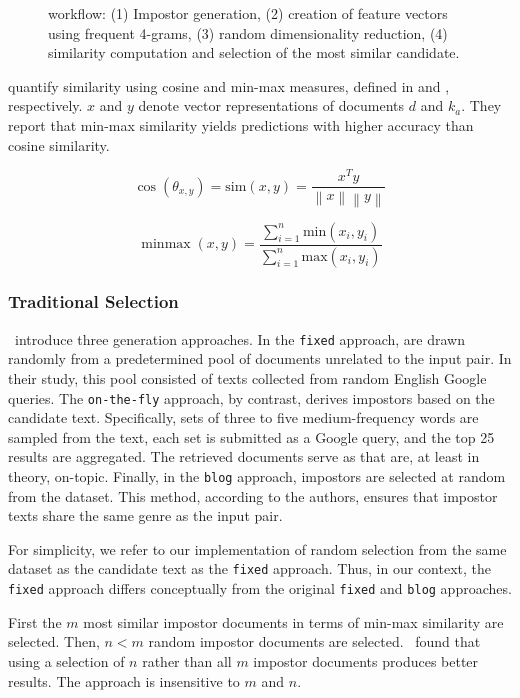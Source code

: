 \begin{figure}[htbp]
    \centering
    
    \caption[\impAppr{} workflow]{\impAppr{} workflow: (1) Impostor generation, (2) creation of feature vectors using frequent 4-grams, (3) random dimensionality reduction, (4) similarity computation and selection of the most similar candidate.}
    \label{fig:impostor}
\end{figure}

\citet{koppel_determining_2014} quantify similarity using cosine and min-max measures, defined in  and , respectively. 
$x$ and $y$ denote vector representations of documents $d$ and $k_a$.
They report that min-max similarity yields predictions with higher accuracy than cosine similarity.

\begin{equation}
    \cos(\theta_{x,y})=\mathrm{sim}(x,y)=\frac{x^Ty}{\left\| x \right\|\left\| y \right\|}
    \label{eq:cosine_sim}
\end{equation}

\begin{equation}
    \operatorname{minmax}(x,y)=\frac{\sum_{i=1}^{n}\mathrm{min}(x_i,y_i)}{\sum_{i=1}^{n}\mathrm{max}(x_i,y_i)}
    \label{eq:min_max_sim}
\end{equation}

\subsubsection{Traditional \Imp{} Selection}
\label{subsubsec:traditional_impostor_generation}

\citet{koppel_determining_2014}\ introduce three \imp{} generation approaches. 
In the \texttt{fixed} approach, \imps{} are drawn randomly from a predetermined pool of documents unrelated to the input pair.
In their study, this pool consisted of texts collected from random English Google queries. 
The \texttt{on-the-fly} approach, by contrast, derives impostors based on the candidate text. 
Specifically, sets of three to five medium-frequency words are sampled from the text, each set is submitted as a Google query, and the top 25 results are aggregated. 
The retrieved documents serve as \imps{} that are, at least in theory, on-topic. 
Finally, in the \texttt{blog} approach, impostors are selected at random from the \dataBlog{} dataset. 
This method, according to the authors, ensures that impostor texts share the same genre as the input pair.

For simplicity, we refer to our implementation of random \imp{} selection from the same dataset as the candidate text as the \texttt{fixed} approach. 
Thus, in our context, the \texttt{fixed} approach differs conceptually from the original \texttt{fixed} and \texttt{blog} approaches.

First the $m$ most similar impostor documents in terms of min-max similarity are selected.
Then, $n < m$ random impostor documents are selected.
\citet{koppel_determining_2014}\ found that using a selection of $n$ \imps{} rather than all $m$ impostor documents produces better results.
The approach is insensitive to $m$ and $n$.
